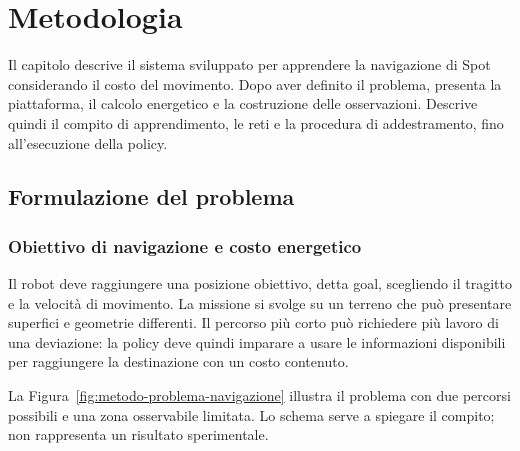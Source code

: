 \chapter{Metodologia}
\label{chap:methodology}


Il capitolo descrive il sistema sviluppato per apprendere la navigazione di Spot considerando il costo del movimento. Dopo aver definito il problema, presenta la piattaforma, il calcolo energetico e la costruzione delle osservazioni. Descrive quindi il compito di apprendimento, le reti e la procedura di addestramento, fino all'esecuzione della policy.

\section{Formulazione del problema}
\label{sec:metodo-problema}

\subsection{Obiettivo di navigazione e costo energetico}

Il robot deve raggiungere una posizione obiettivo, detta goal, scegliendo il tragitto e la velocità di movimento. La missione si svolge su un terreno che può presentare superfici e geometrie differenti. Il percorso più corto può richiedere più lavoro di una deviazione: la policy deve quindi imparare a usare le informazioni disponibili per raggiungere la destinazione con un costo contenuto.

La Figura~\ref{fig:metodo-problema-navigazione} illustra il problema con due percorsi possibili e una zona osservabile limitata. Lo schema serve a spiegare il compito; non rappresenta un risultato sperimentale.

